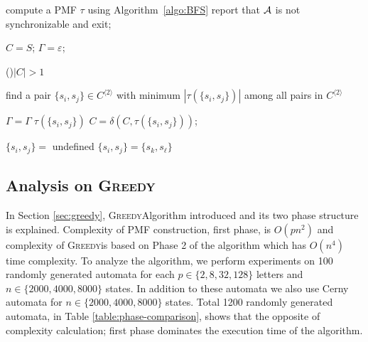\documentclass[12pt]{article}
\newcommand{\comment}[2]{{\color{red}{\bf (#1: #2)}}}
\newcommand{\greedyAlgo}{\textsc{Greedy}}
\begin{document}
\comment{sertac}{complexity $O(n^3)$ mu demeliyiz yoksa $O(n^4)$ mu? interediate phaseden bahsetmeli miyiz?}

\begin{algorithm}[ht]
	\caption{Eppstein's \greedyAlgo \space Algorithm}
	\label{algo:greedy}
	
	
	compute a PMF $\tau$ using Algorithm~\ref{algo:BFS}\;
	{
		report that ${\cal A}$ is not synchronizable and exit;	
	}

	
	$C = S$; 
	$\Gamma = \varepsilon$; 
	
	\While(){$|C| > 1$}
	{
		find a pair $\{ s_i,s_j \} \in C^{\langle 2 \rangle}$ 
		with minimum $|\tau(\{ s_i,s_j \})|$ among all pairs 
		in $C^{\langle 2 \rangle}$\;
		
		
		$\Gamma = \Gamma \; \tau(\{ s_i,s_j \})$\;
		$C = \delta(C,\tau(\{ s_i,s_j \}))$;
	}
\end{algorithm}


\begin{algorithm}[ht]
	\caption{Find\_Min}
	\label{algo:find-min}
	
	
	$\{ s_i,s_j \} =$ undefined\;
	{
		{
			$\{ s_i,s_j \} = \{ s_k, s_\ell \}$
		}
	}
\end{algorithm}



\subsection{Analysis on \greedyAlgo}
\label{sec:greedy-analysis}


In Section \ref{sec:greedy}, \greedyAlgo \space Algorithm introduced and its two phase structure is explained. Complexity of PMF construction, first phase, is $O(pn^2)$ and complexity of \greedyAlgo \space is based on Phase 2 of the algorithm which has $O(n^4)$ time complexity. To analyze the algorithm, we perform experiments on 100 randomly generated automata for each  $p \in \{2, 8, 32, 128\}$ letters and  $n \in \{2000, 4000, 8000\}$ states. In addition to these automata we also use Cerny automata \cite{cerny} for $n \in \{2000, 4000, 8000\}$ states. Total 1200 randomly generated automata, in Table \ref{table:phase-comparison}, shows that the opposite of complexity calculation; first phase dominates the execution time of the algorithm.
\end{document}
